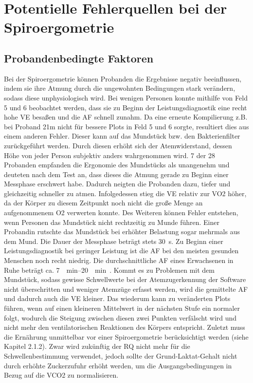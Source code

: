 \section{Potentielle Fehlerquellen bei der Spiroergometrie}
%
\subsection{Probandenbedingte Faktoren}
%
Bei der Spiroergometrie können Probanden die Ergebnisse negativ beeinflussen, indem sie ihre Atmung durch die ungewohnten Bedingungen stark verändern, sodass diese unphysiologisch wird. Bei wenigen Personen konnte mithilfe von Feld 5 und 6 beobachtet werden, dass sie zu Beginn der Leistungsdiagnostik eine recht hohe \acs{VE} besaßen und die \acs{AF} schnell zunahm. Da eine erneute Kompilierung z.B. bei Proband 21m nicht für bessere Plots in Feld 5 und 6 sorgte, resultiert dies aus einem anderen Fehler. Dieser kann auf das Mundstück bzw. den Bakterienfilter zurückgeführt werden. Durch diesen erhöht sich der Atemwiderstand, dessen Höhe von jeder Person subjektiv anders wahrgenommen wird. 7 der 28 Probanden empfanden die Ergonomie des Mundstücks als unangenehm und deuteten nach dem Test an, dass dieses die Atmung gerade zu Beginn einer Messphase erschwert habe. Dadurch neigten die Probanden dazu, tiefer und gleichzeitig schneller zu atmen. Infolgedessen stieg die \acs{VE} relativ zur \acs{VO2} höher, da der Körper zu diesem Zeitpunkt noch nicht die große Menge an aufgenommenem \acs{O2} verwerten konnte. Des Weiteren können Fehler entstehen, wenn Personen das Mundstück nicht rechtzeitig zu Munde führen. Einer Probandin rutschte das Mundstück bei erhöhter Belastung sogar mehrmals aus dem Mund. Die Dauer der Messphase beträgt stets \SI{30}{\second}. Zu Beginn einer Leistungsdiagnostik bei geringer Leistung ist die \acs{AF} bei den meisten gesunden Menschen noch recht niedrig. Die durchschnittliche \acs{AF} eines Erwachsenen in Ruhe beträgt ca. \SIrange{7}{20}{\per\minute}~\cite{Larsen.2017}. Kommt es zu Problemen mit dem Mundstück, sodass gewisse Schwellwerte bei der Atemzugerkennung der Software nicht überschritten und weniger Atemzüge erfasst werden, wird die gemittelte \acs{AF} und dadurch auch die \acs{VE} kleiner. Das wiederum kann zu veränderten Plots führen, wenn auf einen kleineren Mittelwert in der nächsten Stufe ein normaler folgt, wodurch die Steigung zwischen diesen zwei Punkten verfälscht wird und nicht mehr den ventilatorischen Reaktionen des Körpers entspricht. Zuletzt muss die Ernährung unmittelbar vor einer Spiroergometrie berücksichtigt werden (siehe Kapitel 2.1.2). Zwar wird zukünftig der RQ nicht mehr für die Schwellenbestimmung verwendet, jedoch sollte der Grund-Laktat-Gehalt nicht durch erhöhte Zuckerzufuhr erhöht werden, um die Ausgangsbedingungen in Bezug auf die \acs{VCO2} zu normalisieren.
%
